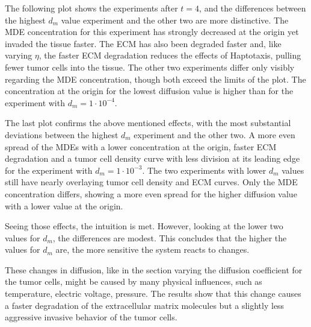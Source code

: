 The following plot shows the experiments after $t=4$, and the differences between the highest $d_m$ value experiment and the other two are more distinctive. The MDE concentration for this experiment has strongly decreased at the origin yet invaded the tissue faster. The ECM has also been degraded faster and, like varying $\eta$, the faster ECM degradation reduces the effects of Haptotaxis, pulling fewer tumor cells into the tissue. The other two experiments differ only visibly regarding the MDE concentration, though both exceed the limits of the plot. The concentration at the origin for the lowest diffusion value is higher than for the experiment with $d_m=1\cdot 10^{-4}$.

The last plot confirms the above mentioned effects, with the most substantial deviations between the highest $d_m$ experiment and the other two. A more even spread of the MDEs with a lower concentration at the origin, faster ECM degradation and a tumor cell density curve with less division at its leading edge for the experiment with $d_m=1\cdot 10^{-3}$. The two experiments with lower $d_m$ values still have nearly overlaying tumor cell density and ECM curves. Only the MDE concentration differs, showing a more even spread for the higher diffusion value with a lower value at the origin. 

Seeing those effects, the intuition is met. However, looking at the lower two values for $d_m$, the differences are modest. This concludes that the higher the values for $d_m$ are, the more sensitive the system reacts to changes.

These changes in diffusion, like in the section varying the diffusion coefficient for the tumor cells, might be caused by many physical influences, such as temperature, electric voltage, pressure. The results show that this change causes a faster degradation of the extracellular matrix molecules but a slightly less aggressive invasive behavior of the tumor cells. 

